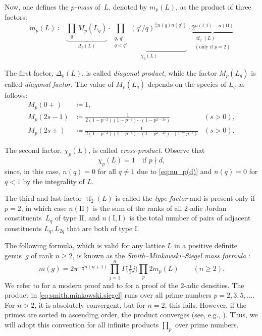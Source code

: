 \documentclass[a4paper]{amsart}
\theoremstyle{definition}
\theoremstyle{plain}
\DeclareMathOperator{\tf}{tf}
\newcommand{\I}{\mathrm{I}}
\newcommand{\II}{\mathrm{II}}
\begin{document}
Now, one defines the \emph{\(p\)-mass} of~\(L\), denoted by \(m_p(L)\), as the product of three factors:
\begin{equation} \label{eq:p-mass}
    m_p(L) \coloneqq \underbrace{\prod_q M_p(L_q)}_{\Delta_p(L)} \cdot \underbrace{\prod_{\substack{q, \, q' \\ q < q'}} (q'/q)^{\frac{1}{2} n(q)n(q')}}_{\chi_p(L)} \cdot \underbrace{2^{n(\I,\I) - n(\II)}}_{\substack{\tf_2(L) \\ (\text{only if } p = 2)}}
\end{equation}

The first factor, \(\Delta_p(L)\), is called \emph{diagonal product}, while the factor \(M_p(L_q)\) is called \emph{diagonal factor}. The value of \(M_p(L_q)\) depends on the species of \(L_q\) as follows:  
\begin{align*}
    M_p(0+) & \coloneqq 1, \\
    M_p(2s-1) & \coloneqq \frac{1}{2(1-p^{-2})(1-p^{-4})\cdots(1-p^{2-2s})} & (s > 0), \\
    M_p(2s\pm) & \coloneqq \frac{1}{2(1-p^{-2})(1-p^{-4})\cdots(1-p^{2-2s}) \cdot (1 \mp p^{-s})} & (s > 0).
\end{align*}

The second factor, \(\chi_p(L)\), is called \emph{cross-product}. Observe that 
\begin{equation} \label{eq:chi_p(L)=1}
    \chi_p(L) = 1 \quad \text{if \(p \nmid d\)},
\end{equation}
since, in this case, \(n(q) = 0\) for all \(q \neq 1\) due to \eqref{eq:nu_p(d)} and \(n(q)=0\) for \(q<1\) by the integrality of \(L\). 

The third and last factor \(\tf_2(L)\) is called the \emph{type factor} and is present only if \(p = 2\), in which case \(n(\II)\) is the sum of the ranks of all \(2\)-adic Jordan constituents~\(L_q\) of type \(\II\), and \(n(\I,\I)\) is the total number of pairs of adjacent constituents \(L_q,L_{2q}\) that are both of type \(\I\).

The following formula, which is valid for any lattice \(L\) in a positive definite genus~\(g\) of rank \(n \geq 2\), is known as the \emph{Smith--Minkowski--Siegel mass formula} \cite[p.~263, eq.~(2)]{ConwaySloane88}:
\begin{equation} \label{eq:smith.minkowski.siegel}
    m(g) = 2\pi^{-\frac{1}{4}n(n+1)} \prod_{j=1}^n \Gamma\big(\tfrac{1}{2}j\big) \prod_p 2m_p(L) \qquad (n \geq 2).
\end{equation}
We refer to \cite[(33.6), (35.1)]{kneser} for a modern proof and to \cite{cho2015} for a proof of the \(2\)-adic densities.  
The product in \eqref{eq:smith.minkowski.siegel} runs over all prime numbers \(p = 2, 3, 5, \ldots\).  
For \(n > 2\), it is absolutely convergent, but for \(n = 2\), this fails. However, if the primes are sorted in ascending order, the product converges (see, e.g., \cite[\S 109]{landau}).  
Thus, we will adopt this convention for all infinite products \(\prod_p\) over prime numbers.
\end{document}
